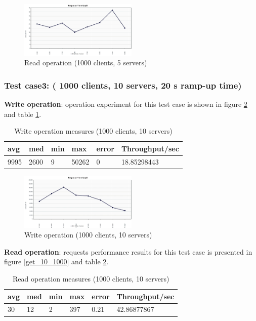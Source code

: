 \documentclass{sig-alternate}
\begin{document}
 \begin{center}
\begin{figure}[ht!]
\centering
     \includegraphics[width=0.5\textwidth]{get_5_1000_response.png}
\caption{Read operation (1000 clients, 5 servers) \label{get_5_1000}}
\end{figure}
\end{center}
\subsubsection{Test case3: ( 1000 clients, 10 servers, 20 s ramp-up time)}
 \textbf{Write operation}: operation experiment for this test case is shown in figure \ref{put_10_1000} and table \ref{put_10_1000_tbl}.
\begin{table}[h]
\begin{tabular}{|l|l|l|l|l|l|}
\hline
\textbf{avg} & \textbf{med} & \textbf{min} & \textbf{max} & \textbf{error} & \textbf{Throughput/sec} \\ \hline
9995 & 2600 & 9 & 50262 & 0 & 18.85298443 \\ \hline
\end{tabular}\caption{Write operation measures (1000 clients, 10 servers)}\label{put_10_1000_tbl}
\end{table} 
 \begin{center}
\begin{figure}[ht!]
\centering
     \includegraphics[width=0.5\textwidth]{put_10_1000_response.png}
\caption{Write operation (1000 clients, 10 servers) \label{put_10_1000}}
\end{figure}
\end{center}
 \textbf{Read operation}: requests performance results for this test case is presented in figure \ref{get_10_1000} and table \ref{get_10_1000_tbl}.
 \begin{table}[h]
\begin{tabular}{|l|l|l|l|l|l|}
\hline
\textbf{avg} & \textbf{med} & \textbf{min} & \textbf{max} & \textbf{error} & \textbf{Throughput/sec} \\ \hline
30 & 12 & 2 & 397 & 0.21 & 42.86877867 \\ \hline
\end{tabular}\caption{Read operation measures (1000 clients, 10 servers)}\label{get_10_1000_tbl}
\end{table}
\end{document}
